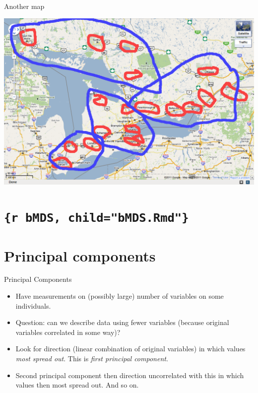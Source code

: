 \documentclass[
  ignorenonframetext,
]{beamer}
\begin{document}
\begin{frame}{Another map}
\protect\hypertarget{another-map}{}

\includegraphics{map2.png}

\end{frame}

\hypertarget{r-bmds-childbmds.rmd}{%
\section{\texorpdfstring{\texttt{\{r\ bMDS,\ child="bMDS.Rmd"\}}}{\{r bMDS, child="bMDS.Rmd"\}}}\label{r-bmds-childbmds.rmd}}

\hypertarget{principal-components}{%
\section{Principal components}\label{principal-components}}

\begin{frame}{Principal Components}
\protect\hypertarget{principal-components-1}{}

\begin{itemize}
\item
  Have measurements on (possibly large) number of variables on some
  individuals.
\item
  Question: can we describe data using fewer variables (because original
  variables correlated in some way)?
\item
  Look for direction (linear combination of original variables) in which
  values \emph{most spread out}. This is \emph{first principal
  component}.
\item
  Second principal component then direction uncorrelated with this in
  which values then most spread out. And so on.
\end{itemize}

\end{frame}
\end{document}
